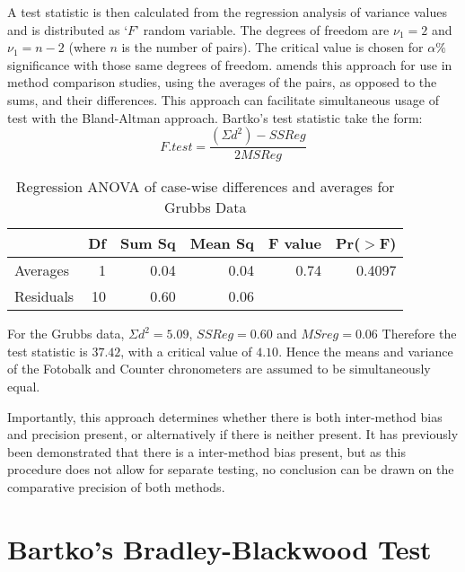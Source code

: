 \documentclass[MAIN.tex]{subfiles}
\begin{document}
	A test statistic is then calculated from the regression analysis
	of variance values \citep{BB89} and is distributed as `$F$' random
	variable. The degrees of freedom are $\nu_{1}=2$ and $\nu_{1}=n-2$
	(where $n$ is the number of pairs). The critical value is chosen
	for $\alpha\%$ significance with those same degrees of freedom.
	\citet{Bartko} amends this approach for use in method
	comparison studies, using the averages of the pairs, as opposed to
	the sums, and their differences. This approach can facilitate
	simultaneous usage of test with the Bland-Altman approach.
	Bartko's test statistic take the form:
	\[ F.test = \frac{(\Sigma d^{2})-SSReg}{2MSReg}
	\]
	\begin{table}[h!]
		\begin{center}
			\begin{tabular}{lrrrrr}
				\hline
				& Df & Sum Sq & Mean Sq & F value & Pr($>$F) \\
				\hline
				Averages & 1 & 0.04 & 0.04 & 0.74 & 0.4097 \\
				Residuals & 10 & 0.60 & 0.06 &  &  \\
				\hline
			\end{tabular}
			\caption{Regression ANOVA of case-wise differences and averages
				for Grubbs Data}
		\end{center}
	\end{table}
	
	For the Grubbs data, $\Sigma d^{2}=5.09 $, $SSReg = 0.60$ and
	$MSreg=0.06$ Therefore the test statistic is $37.42$, with a
	critical value of $4.10$. Hence the means and variance of the
	Fotobalk and Counter chronometers are assumed to be simultaneously
	equal.
	
	Importantly, this approach determines whether there is both
	inter-method bias and precision present, or alternatively if there
	is neither present. It has previously been demonstrated that there
	is a inter-method bias present, but as this procedure does not
	allow for separate testing, no conclusion can be drawn on the
	comparative precision of both methods.
	
	
	\section{Bartko's Bradley-Blackwood Test}
\end{document}
